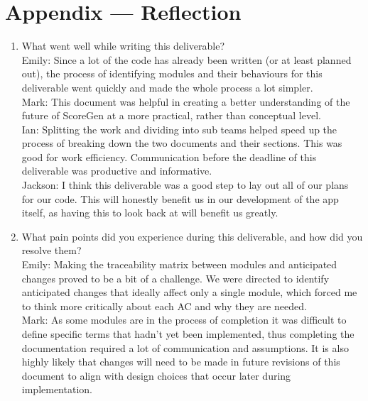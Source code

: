 \documentclass[12pt, titlepage]{article}
\begin{document}
\newpage




\newpage

\section*{Appendix --- Reflection}



\begin{enumerate}
  \item What went well while writing this deliverable?  \\
  
    Emily: Since a lot of the code has already been written (or at least planned out), 
    the process of identifying modules and their behaviours for this deliverable went 
    quickly and made the whole process a lot simpler.\\

    Mark: This document was helpful in creating a better understanding of the future 
    of ScoreGen at a more practical, rather than conceptual level. \\

    Ian: Splitting the work and dividing into sub teams helped speed up the process of 
    breaking down the two documents and their sections. This was good for work efficiency. 
    Communication before the deadline of this deliverable was productive and informative. \\

    Jackson: I think this deliverable was a good step to lay out all of our plans for 
    our code. This will honestly benefit us in our development of the app itself, as 
    having this to look back at will benefit us greatly.  \\
  
  \item What pain points did you experience during this deliverable, and how
  did you resolve them? \\

    Emily: Making the traceability matrix between modules and anticipated changes proved
    to be a bit of a challenge. We were directed to identify anticipated changes that ideally 
    affect only a single module, which forced me to think more critically about each AC and 
    why they are needed. \\

    Mark: As some modules are in the process of completion it was difficult to define specific 
    terms that hadn’t yet been implemented, thus completing the documentation required a lot of 
    communication and assumptions. It is also highly likely that changes will need to be made in 
    future revisions of this document to align with design choices that occur later during 
    implementation. \\


\end{enumerate}
\end{document}
